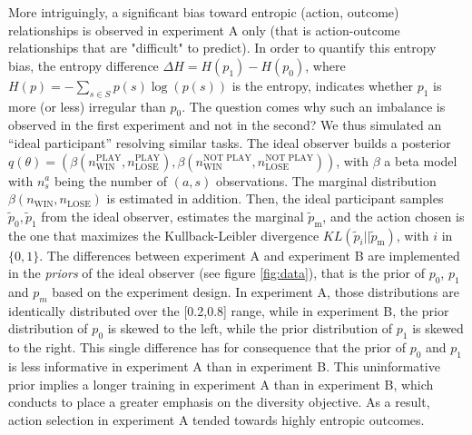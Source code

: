 \documentclass[10pt,letterpaper]{article}
\begin{document}
More intriguingly, a significant bias toward entropic (action, outcome) relationships is observed in experiment A only (that is action-outcome relationships that are "difficult" to predict). In order to quantify this entropy bias, the entropy difference $\Delta H = H(p_1) - H(p_0)$, where $H(p)=-\sum_{s \in S}p(s)\log(p(s))$ is the entropy, indicates whether $p_1$ is more (or less) irregular than $p_0$. %
The question comes why such an imbalance is observed in the first experiment and not in the second? We thus simulated an ``ideal participant'' resolving similar tasks.
The ideal observer builds a posterior $q(\theta) = (\beta(n_{\text{WIN}}^{\text{PLAY}}, n_{\text{LOSE}}^{\text{PLAY}}), \beta(n_{\text{WIN}}^{\text{NOT PLAY}}, n_{\text{LOSE}}^{\text{NOT PLAY}}))$, with $\beta$ a beta model with $n_s^a$ being the number of $(a,s)$ observations. The marginal distribution $\beta(n_{\text{WIN}},n_{\text{LOSE}})$ is estimated in addition.
Then, the ideal participant samples $ \tilde{p}_0,  \tilde{p}_1$ from the ideal observer, estimates the marginal $\tilde{p}_\text{m}$, and the action chosen is the one that maximizes the Kullback-Leibler divergence $KL(\tilde{p}_i||\tilde{p}_\text{m})$, with $i$ in $\{0,1\}$.
The differences between experiment A and experiment B are implemented in the \emph{priors} of the ideal observer (see figure \ref{fig:data}), that is the prior of $p_0$, $p_1$ and $p_m$ based on the experiment design. In experiment A, those distributions are identically distributed over the [0.2,0.8] range, while in experiment B, the prior distribution of $p_0$ is skewed to the left, while the prior distribution of $p_1$ is skewed to the right. This single difference has for consequence that the prior of $p_0$ and $p_1$ is less informative in experiment A than in experiment B. This uninformative prior implies a longer training in experiment A than in experiment B, which conducts to place a greater emphasis on the diversity objective. As a result, action selection in experiment A tended towards highly entropic outcomes.
\end{document}
